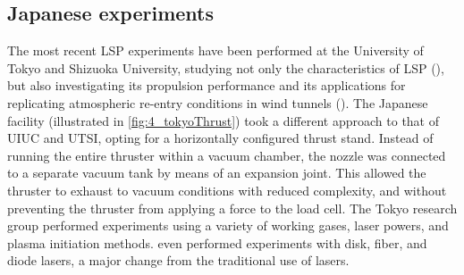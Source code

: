         \subsection{Japanese experiments}
            The most recent LSP experiments have been performed at the University of Tokyo and Shizuoka University, studying not only the characteristics of LSP (\textcite{inoueOscillationPhenomenonLasersustained2004}), but also investigating its propulsion performance and its applications for replicating atmospheric re-entry conditions in wind tunnels (\textcite{matsuiAtomicOxygenFlowGenerationLaserDriven2014}). The Japanese facility (illustrated in \autoref{fig:4_tokyoThrust}) took a different approach to that of UIUC and UTSI, opting for a horizontally configured thrust stand. Instead of running the entire thruster within a vacuum chamber, the nozzle was connected to a separate vacuum tank by means of an expansion joint. This allowed the thruster to exhaust to vacuum conditions with reduced complexity, and without preventing the thruster from applying a force to the load cell. The Tokyo research group performed experiments using a variety of working gases, laser powers, and plasma initiation methods. \textcite{matsuiGeneratingConditionsArgon2019} even performed experiments with disk, fiber, and diode lasers, a major change from the traditional use of  lasers.

